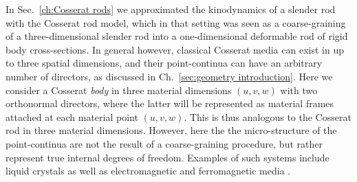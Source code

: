 In Sec.~\ref{ch:Cosserat rods} we approximated the kinodynamics of a slender rod with the Cosserat rod model, which in that setting was seen as a coarse-graining of a three-dimensional slender rod into a one-dimensional deformable rod of rigid body cross-sections. In general however, classical Cosserat media can exist in up to three spatial dimensions, and their point-continua can have an arbitrary number of directors, as discussed in Ch.~\ref{sec:geometry introduction}. Here we consider a Cosserat \textit{body} in three material dimensions $(u, v, w)$ with two orthonormal directors, where the latter will be represented as material frames attached at each material point $(u, v, w)$. This is thus analogous to the Cosserat rod in three material dimensions. However, here the the micro-structure of the point-continua are not the result of a coarse-graining procedure, but rather represent true internal degrees of freedom. Examples of such systems include liquid crystals \citep{epsteinContinuousDistributionsInhomogeneities2001, gorielyRodTheoryLiquid2022} as well as electromagnetic and ferromagnetic media \citep{ivanovaNewTheoryCosserat2022, pariaUnifiedTheoryMechanics1978, ivanovaModelingPhysicalFields}.

